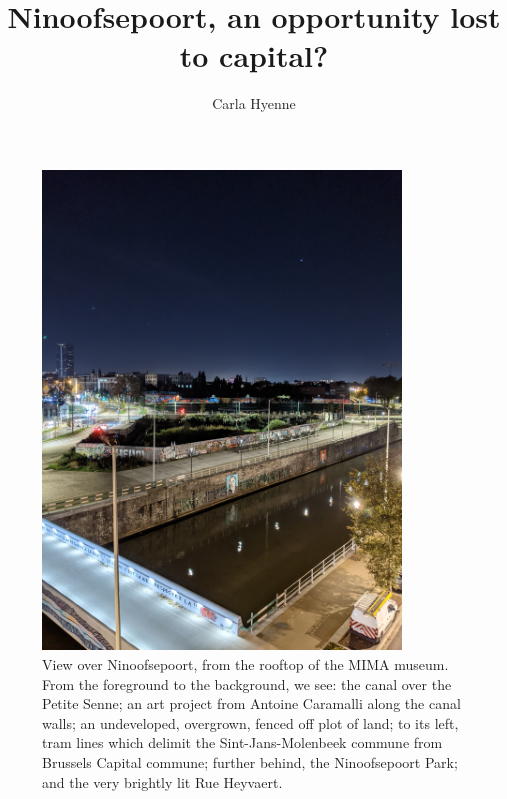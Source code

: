 \documentclass{article}[11pt]
\title{Ninoofsepoort, an opportunity lost to capital?}
\author{Carla Hyenne}
\date{}
\begin{document}

\maketitle

\begin{figure}[h!]
	\centering
	\captionsetup{labelformat=empty}
	\includegraphics[width=0.85\textwidth, angle=-90]{bxl_canal_far}
	\caption{View over Ninoofsepoort, from the rooftop of the MIMA museum. From the foreground to the background, we see: the canal over the Petite Senne; an art project from Antoine Caramalli along the canal walls; an undeveloped, overgrown, fenced off plot of land; to its left, tram lines which delimit the Sint-Jans-Molenbeek commune from Brussels Capital commune; further behind, the Ninoofsepoort Park; and the very brightly lit Rue Heyvaert.}
\end{figure}

\restoregeometry

\pagebreak
\end{document}
